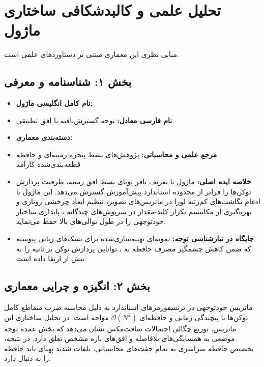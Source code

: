 \section{تحلیل علمی و کالبدشکافی ساختاری ماژول }

مبانی نظری این معماری مبتنی بر دستاوردهای علمی \cite{vaswani2017attention} است.
\label{sec:span_expanded_attention}

\subsection*{بخش ۱: شناسنامه و معرفی }
\begin{itemize}
    \item \textbf{نام کامل انگلیسی ماژول:} 
    \item \textbf{نام فارسی معادل:} توجه گسترش‌یافته با افق تطبیقی 
    \item \textbf{دسته‌بندی معماری:} 
    \item \textbf{مرجع علمی و محاسباتی:} پژوهش‌های بسط پنجره زمینه‌ای و حافظه قطعه‌بندی‌شده کارآمد 
    \item \textbf{خلاصه ایده اصلی:} ماژول  با تعریف بافر پویای بسط افق زمینه، ظرفیت پردازش توکن‌ها را فراتر از محدوده استاندارد پیش‌آموزش گسترش می‌دهد. این ماژول با ادغام نگاشت‌های کم‌رتبه لورا  در ماتریس‌های تصویر، تنظیم ابعاد چرخشی روتاری  و بهره‌گیری از مکانیسم تکرار کلید-مقدار در سرپوش‌های چندگانه ، پایداری ساختار خودتوجهی را در طول توالی‌های بالا حفظ می‌نماید.
    \item \textbf{جایگاه در تبارشناسی توجه:} نمونه‌ای بهینه‌سازی‌شده برای تسک‌های زبانی پیوسته که ضمن کاهش چشمگیر مصرف حافظه به ، توانایی پردازش توکن بر ثانیه را به بیش از  ارتقا داده است.
\end{itemize}

\subsection*{بخش ۲: انگیزه و چرایی معماری }
ماتریس خودتوجهی در ترنسفورمرهای استاندارد به دلیل محاسبه ضرب متقاطع کامل توکن‌ها با پیچیدگی زمانی و حافظه‌ای $\mathcal{O}(N^2)$ مواجه است. در تحلیل ساختاری این ماتریس، توزیع چگالی احتمالات سافت‌مکس نشان می‌دهد که بخش عمده توجه موضعی به همسایگی‌های بلافاصله و افق‌های بازه مشخص تعلق دارد. در نتیجه، تخصیص حافظه سراسری به تمام جفت‌های محاسباتی، تلفات شدید پهنای باند حافظه  را به دنبال دارد.

